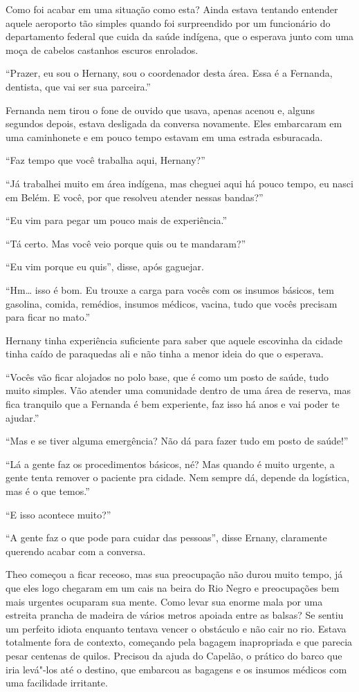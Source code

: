 Como foi acabar em uma situação como esta? Ainda estava tentando
entender aquele aeroporto tão simples quando foi surpreendido por um
funcionário do departamento federal que cuida da saúde indígena, que o
esperava junto com uma moça de cabelos castanhos escuros enrolados.

``Prazer, eu sou o Hernany, sou o coordenador desta área. Essa é a
Fernanda, dentista, que vai ser sua parceira.''

Fernanda nem tirou o fone de ouvido que usava, apenas acenou e, alguns
segundos depois, estava desligada da conversa novamente. Eles embarcaram
em uma caminhonete e em pouco tempo estavam em uma estrada esburacada.

``Faz tempo que você trabalha aqui, Hernany?''

``Já trabalhei muito em área indígena, mas cheguei aqui há pouco tempo,
eu nasci em Belém. E você, por que resolveu atender nessas bandas?''

``Eu vim para pegar um pouco mais de experiência.''

``Tá certo. Mas você veio porque quis ou te mandaram?''

``Eu vim porque eu quis'', disse, após gaguejar.

``Hm\ldots{} isso é bom. Eu trouxe a carga para vocês com os insumos
básicos, tem gasolina, comida, remédios, insumos médicos, vacina, tudo
que vocês precisam para ficar no mato.''

Hernany tinha experiência suficiente para saber que aquele escovinha da
cidade tinha caído de paraquedas ali e não tinha a menor ideia do que o
esperava.

``Vocês vão ficar alojados no polo base, que é como um posto de saúde,
tudo muito simples. Vão atender uma comunidade dentro de uma área de
reserva, mas fica tranquilo que a Fernanda é bem experiente, faz isso há
anos e vai poder te ajudar.''

``Mas e se tiver alguma emergência? Não dá para fazer tudo em posto de
saúde!''

``Lá a gente faz os procedimentos básicos, né? Mas quando é muito
urgente, a gente tenta remover o paciente pra cidade. Nem sempre dá,
depende da logística, mas é o que temos.''

``E isso acontece muito?''

``A gente faz o que pode para cuidar das pessoas'', disse Ernany,
claramente querendo acabar com a conversa.

Theo começou a ficar receoso, mas sua preocupação não durou muito tempo,
já que eles logo chegaram em um cais na beira do Rio Negro e
preocupações bem mais urgentes ocuparam sua mente. Como levar sua enorme
mala por uma estreita prancha de madeira de vários metros apoiada entre
as balsas? Se sentiu um perfeito idiota enquanto tentava vencer o
obstáculo e não cair no rio. Estava totalmente fora de contexto,
começando pela bagagem inapropriada e que parecia pesar centenas de
quilos. Precisou da ajuda do Capelão, o prático do barco que iria
levá"-los até o destino, que embarcou as bagagens e os insumos médicos
com uma facilidade irritante.

